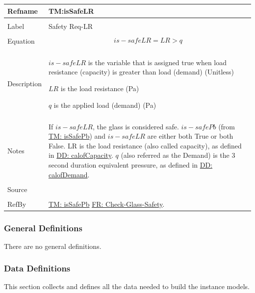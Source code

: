 \documentclass[12pt]{article}
\begin{document}
\noindent \begin{minipage}{\textwidth}
\begin{tabular}{p{} p{}}
\toprule \textbf{Refname} & \textbf{TM:isSafeLR}
\label{TM:isSafeLR}
\\ \midrule \\
Label & Safety Req-LR
\\ \midrule \\
Equation & \begin{displaymath}
           is-safeLR=LR>q
           \end{displaymath}
\\ \midrule \\
Description & \begin{symbDescription}
              \item{$is-safeLR$ is the variable that is assigned true when load resistance (capacity) is greater than load (demand) (Unitless)}
              \item{$LR$ is the load resistance (Pa)}
              \item{$q$ is the applied load (demand) (Pa)}
              \end{symbDescription}
\\ \midrule \\
Notes & If $is-safeLR$, the glass is considered safe. $is-safePb$ (from \hyperref[TM:isSafePb]{TM: isSafePb}) and $is-safeLR$ are either both True or both False. LR is the load resistance (also called capacity), as defined in \hyperref[DD:calofCapacity]{DD: calofCapacity}. $q$ (also referred as the Demand) is the 3 second duration equivalent pressure, as defined in \hyperref[DD:calofDemand]{DD: calofDemand}.
\\ \midrule \\
Source & \cite{astm2009}
\\ \midrule \\
RefBy & \hyperref[TM:isSafePb]{TM: isSafePb} \hyperref[checkGlassSafety]{FR: Check-Glass-Safety}.
\\ \bottomrule \end{tabular}
\end{minipage}
\subsubsection{General Definitions}
\label{Sec:GDs}
There are no general definitions.
\subsubsection{Data Definitions}
\label{Sec:DDs}
This section collects and defines all the data needed to build the instance models.
\par~
\end{document}
